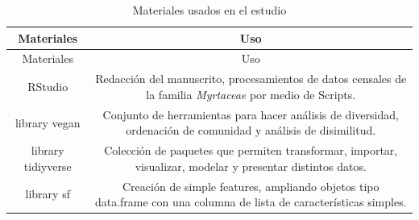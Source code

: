 \documentclass[11pt,]{article}
\begin{document}
\begin{longtable}[]{@{}cc@{}}
\caption{\label{tab:materiales} Materiales usados en el
estudio}\tabularnewline
\toprule
\begin{minipage}[b]{0.14\columnwidth}\centering\strut
Materiales\strut
\end{minipage} & \begin{minipage}[b]{0.80\columnwidth}\centering\strut
Uso\strut
\end{minipage}\tabularnewline
\midrule
\endfirsthead
\toprule
\begin{minipage}[b]{0.14\columnwidth}\centering\strut
Materiales\strut
\end{minipage} & \begin{minipage}[b]{0.80\columnwidth}\centering\strut
Uso\strut
\end{minipage}\tabularnewline
\midrule
\endhead
\begin{minipage}[t]{0.14\columnwidth}\centering\strut
RStudio\strut
\end{minipage} & \begin{minipage}[t]{0.80\columnwidth}\centering\strut
Redacción del manuscrito, procesamientos de datos censales de la familia
\emph{Myrtaceae} por medio de Scripts.\strut
\end{minipage}\tabularnewline
\begin{minipage}[t]{0.14\columnwidth}\centering\strut
library vegan\strut
\end{minipage} & \begin{minipage}[t]{0.80\columnwidth}\centering\strut
Conjunto de herramientas para hacer análisis de diversidad, ordenación
de comunidad y análisis de disimilitud.\strut
\end{minipage}\tabularnewline
\begin{minipage}[t]{0.14\columnwidth}\centering\strut
library tidiyverse\strut
\end{minipage} & \begin{minipage}[t]{0.80\columnwidth}\centering\strut
Colección de paquetes que permiten transformar, importar, visualizar,
modelar y presentar distintos datos.\strut
\end{minipage}\tabularnewline
\begin{minipage}[t]{0.14\columnwidth}\centering\strut
library sf\strut
\end{minipage} & \begin{minipage}[t]{0.80\columnwidth}\centering\strut
Creación de simple features, ampliando objetos tipo data.frame con una
columna de lista de características simples.\strut

\end{minipage}
\end{longtable}
\end{document}
